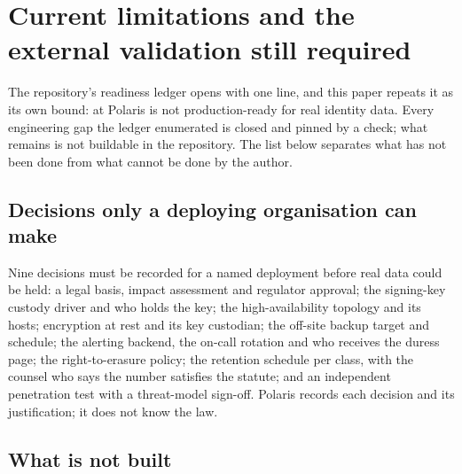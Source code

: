 \section{Current limitations and the external validation still required}
\label{sec:limitations}

The repository's readiness ledger opens with one line, and this paper repeats it as its own bound:
at  Polaris is not production-ready for real identity data. Every engineering gap the
ledger enumerated is closed and pinned by a check; what remains is not buildable in the repository.
The list below separates what has not been done from what cannot be done by the author.

\subsection{Decisions only a deploying organisation can make}

Nine decisions must be recorded for a named deployment before real data could be held: a legal
basis, impact assessment and regulator approval; the signing-key custody driver and who holds the
key; the high-availability topology and its hosts; encryption at rest and its key custodian; the
off-site backup target and schedule; the alerting backend, the on-call rotation and who receives the
duress page; the right-to-erasure policy; the retention schedule per class, with the counsel who says
the number satisfies the statute; and an independent penetration test with a threat-model sign-off.
Polaris records each decision and its justification; it does not know the law. \sExt

\subsection{What is not built}

